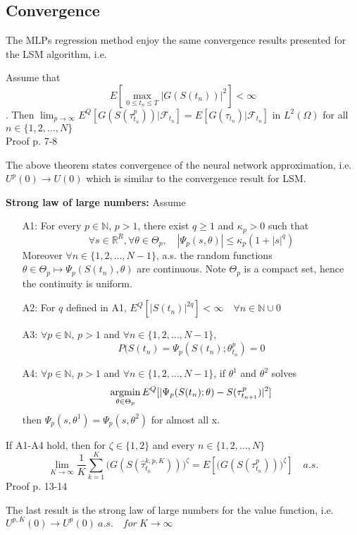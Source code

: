 \subsection{Convergence}
The MLPs regression method enjoy the same convergence results presented for the LSM algorithm, i.e.
\begin{theorem}\label{NNConvergence1}
Assume that 
$$E[\max_{0\leq t_n \leq T} |G(S(t_n))|^2]< \infty$$. 
Then $\lim_{p \to \infty} E^Q[G(S(\tau^{p}_{t_n}))| \mathcal{F}_{t_n}]= E[G(\tau_{t_n})|\mathcal{F}_{t_n}]$ in $L^2(\Omega)$ for all $n \in \{1,2,\ldots, N\}$\\
Proof p. 7-8 \parencite{Lelong19}
\end{theorem}
The above theorem states convergence of the neural network approximation, i.e. $U^{p}(0) \to U(0)$ which is similar to the convergence result for LSM. 
\begin{theorem}{\textbf{Strong law of large numbers: }}\label{NNConvergence2}
Assume
\begin{enumerate}
\item[A1:] For every $p\in \mathbb{N}$, $p>1$, there exist $q \geq 1$ and $\kappa_p>0$ such that
$$\forall s \in \mathbb{R}^{R}, \forall \theta \in \Theta_p, \quad |\Psi_p(s,\theta)| \leq \kappa_p (1+|s|^q) $$
Moreover $\forall n \in \{1,2,\ldots, N-1\}$, a.s. the random functions $\theta \in \Theta_p \mapsto \Psi_p(S(t_n), \theta)$ are continuous. Note $\Theta_p$ is a compact set, hence the continuity is uniform.
\item[A2:] For $q$ defined in A1, $E^Q[|S(t_n)|^{2q}]<\infty \quad \forall n \in \mathbb{N} \cup 0$
\item[A3:] $\forall p \in \mathbb{N}$, $p>1$ and $\forall n \in \{1,2,\ldots, N-1\}$, 
$$P(S(t_n)=\Psi_{p}(S(t_n);\theta_{t_n}^{p})=0$$
\item[A4:] $\forall p \in \mathbb{N}$, $p>1$ and $\forall n \in \{1,2,\ldots, N-1\}$, if $\theta^{1}$ and $\theta^{2}$ solves 
\begin{align*}
\operatorname*{argmin}_{\theta \in \Theta_p} E^Q[|\Psi_p(S(t_n); \theta)- S(\tau_{t_{n+1}}^{p})|^2]
\end{align*}
then $\Psi_p(s,\theta^{1})=\Psi_p(s,\theta^{2})$ for almost all x.
\end{enumerate}
If A1-A4 hold, then for $\zeta\in \{1,2\}$ and every $n\in \{1,2,\ldots,N\}$
\begin{equation}
\lim_{K\to \infty} \dfrac{1}{K} \sum_{k=1}^{K} \bigg(G(S(\hat{\tau}_{t_n}^{k,p,K}))\bigg)^{\zeta} = E[\bigg(G(S(\tau_{t_n}^{p}))\bigg)^{\zeta}] \quad a.s.
\end{equation}
Proof p. 13-14 \parencite{Lelong19}
\end{theorem}
The last result is the strong law of large numbers for the value function, i.e. $U^{p,K}(0) \to U^{p}(0) \ a.s. \quad for \ K \to \infty$